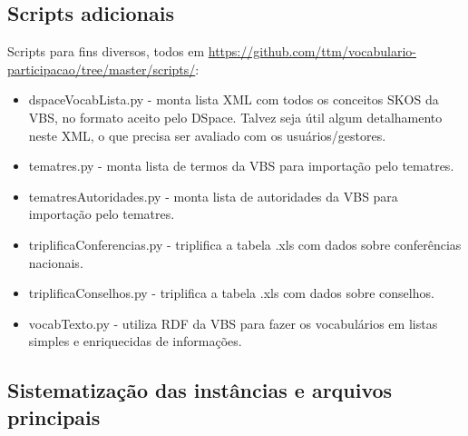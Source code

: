 \documentclass[12pt]{article}
\begin{document}
\subsection{Scripts adicionais}
Scripts para fins diversos, todos em \url{https://github.com/ttm/vocabulario-participacao/tree/master/scripts/}:
\begin{itemize}
    \item dspaceVocabLista.py - monta lista XML com todos os conceitos SKOS da VBS, no formato aceito pelo DSpace. Talvez seja útil algum detalhamento neste XML, o que precisa ser avaliado com os usuários/gestores.
    \item tematres.py - monta lista de termos da VBS para importação pelo tematres.
    \item tematresAutoridades.py - monta lista de autoridades da VBS para importação pelo tematres.
    \item triplificaConferencias.py - triplifica a tabela .xls com dados sobre conferências nacionais.
    \item triplificaConselhos.py -  triplifica a tabela .xls com dados sobre conselhos.
    \item vocabTexto.py - utiliza RDF da VBS para fazer os vocabulários em listas simples e enriquecidas de informações.
\end{itemize}

\subsection{Sistematização das instâncias e arquivos principais}\label{ap:sist}
\end{document}
